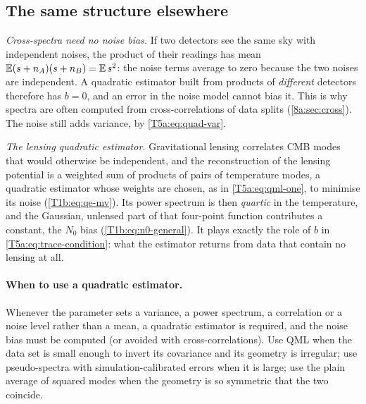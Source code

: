 \subsection{The same structure elsewhere}
\label{T5a:sec:quad-elsewhere}

\emph{Cross-spectra need no noise bias.} If two detectors see the same sky
with independent noises, the product of their readings has mean
$\E(s+n_A)(s+n_B)=\E s^2$: the noise terms average to zero because the two
noises are independent. A quadratic estimator built from products of
\emph{different} detectors therefore has $b=0$, and an error in the noise
model cannot bias it. This is why spectra are often computed from
cross-correlations of data splits (\cref{8a:sec:cross}). The noise still adds
variance, by \eqref{T5a:eq:quad-var}.

\emph{The lensing quadratic estimator.} Gravitational lensing correlates CMB
modes that would otherwise be independent, and the reconstruction of the
lensing potential is a weighted sum of products of pairs of temperature
modes, a quadratic estimator whose weights are chosen, as in
\eqref{T5a:eq:qml-one}, to minimise its noise \cite{HuOkamoto2002}
(\cref{T1b:eq:qe-mv}). Its power spectrum is then \emph{quartic} in the
temperature, and the Gaussian, unlensed part of that four-point function
contributes a constant, the $N_0$ bias (\cref{T1b:eq:n0-general}). It plays
exactly the role of $b$ in \eqref{T5a:eq:trace-condition}: what the
estimator returns from data that contain no lensing at all.

\paragraph{When to use a quadratic estimator.}
Whenever the parameter sets a variance, a power spectrum, a correlation or
a noise level rather than a mean, a quadratic estimator is required, and the
noise bias must be computed (or avoided with cross-correlations). Use QML
when the data set is small enough to invert its covariance and its geometry
is irregular; use pseudo-spectra with simulation-calibrated errors when it is
large; use the plain average of squared modes when the geometry is so
symmetric that the two coincide.

